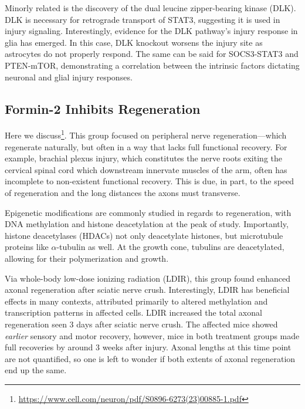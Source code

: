 Minorly related is the discovery of the dual leucine zipper-bearing kinase (DLK). DLK is necessary for retrograde transport of STAT3, suggesting it is used in injury signaling. Interestingly, evidence for the DLK pathway's injury response in glia has emerged. In this case, DLK knockout worsens the injury site as astrocytes do not properly respond. The same can be said for SOCS3-STAT3 and PTEN-mTOR, demonstrating a correlation between the intrinsic factors dictating neuronal and glial injury responses. 


\subsection{Formin-2 Inhibits Regeneration}

Here we discuss\footnote{\url{https://www.cell.com/neuron/pdf/S0896-6273(23)00885-1.pdf}}. This group focused on peripheral nerve regeneration---which regenerate naturally, but often in a way that lacks full functional recovery. For example, brachial plexus injury, which constitutes the nerve roots exiting the cervical spinal cord which downstream innervate muscles of the arm, often has incomplete to non-existent functional recovery. This is due, in part, to the speed of regeneration and the long distances the axons must transverse.\newline

Epigenetic modifications are commonly studied in regards to regeneration, with DNA methylation and histone deacetylation at the peak of study. Importantly, histone deacetylases (HDACs) not only deacetylate histones, but microtubule proteins like $\alpha$-tubulin as well. At the growth cone, tubulins are deacetylated, allowing for their polymerization and growth. \newline

Via whole-body low-dose ionizing radiation (LDIR), this group found enhanced axonal regeneration after sciatic nerve crush. Interestingly, LDIR has beneficial effects in many contexts, attributed primarily to altered methylation and transcription patterns in affected cells. LDIR increased the total axonal regeneration seen 3 days after sciatic nerve crush. The affected mice showed \textit{earlier} sensory and motor recovery, however, mice in both treatment groups made full recoveries by around 3 weeks after injury. Axonal lengths at this time point are not quantified, so one is left to wonder if both extents of axonal regeneration end up the same. \newline


